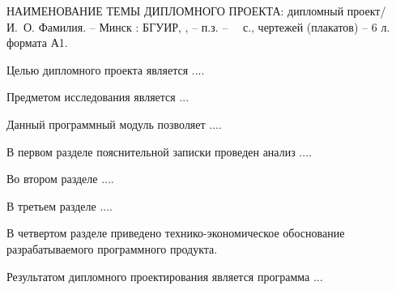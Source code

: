 \thispagestyle{empty}

\MakeUppercase{наименование темы дипломного проекта}: дипломный проект/ И.~О. Фамилия. -- Минск : БГУИР, \the\year{}, -- п.з. -- ~\pageref*{LastPage}~с., чертежей (плакатов) -- 6 л. формата А1.

\vspace{4\parsep}


Целью дипломного проекта является .... 

Предметом исследования является ...

Данный программный модуль позволяет ....

В первом разделе пояснительной записки проведен анализ ....

Во втором разделе ....

В третьем разделе ....

В четвертом разделе приведено технико-экономическое обоснование разрабатываемого программного продукта.

Результатом дипломного проектирования является программа ...

\clearpage